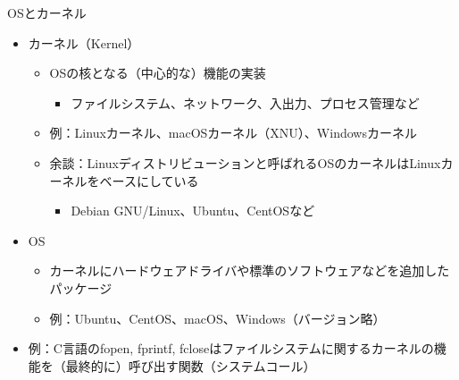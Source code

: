 \documentclass[12pt,aspectratio=169]{beamer}
\begin{document}
\begin{frame}{OSとカーネル}
  \begin{itemize}
    \item カーネル（Kernel）
      \begin{itemize}
        \item OSの核となる（中心的な）機能の実装
          \begin{itemize}
            \item ファイルシステム、ネットワーク、入出力、プロセス管理など
          \end{itemize}
        \item 例：Linuxカーネル、macOSカーネル（XNU）、Windowsカーネル
        \item 余談：Linuxディストリビューションと呼ばれるOSのカーネルはLinuxカーネルをベースにしている
          \begin{itemize}
            \item Debian GNU/Linux、Ubuntu、CentOSなど
          \end{itemize}
      \end{itemize}

      \item OS
        \begin{itemize}
          \item カーネルにハードウェアドライバや標準のソフトウェアなどを追加したパッケージ
          \item 例：Ubuntu、CentOS、macOS、Windows（バージョン略）
        \end{itemize}

      \item 例：C言語のfopen, fprintf, fcloseはファイルシステムに関するカーネルの機能を（最終的に）呼び出す関数（システムコール）
  \end{itemize}

\end{frame}
\end{document}
